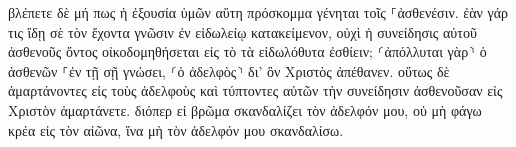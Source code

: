 \documentclass{openreader}
\begin{document}
βλέπετε δὲ μή πως ἡ ἐξουσία ὑμῶν αὕτη πρόσκομμα γένηται τοῖς ⸀ἀσθενέσιν. 
ἐὰν γάρ τις ἴδῃ σὲ τὸν ἔχοντα γνῶσιν ἐν εἰδωλείῳ κατακείμενον, οὐχὶ ἡ συνείδησις αὐτοῦ ἀσθενοῦς ὄντος οἰκοδομηθήσεται εἰς τὸ τὰ εἰδωλόθυτα ἐσθίειν; 
⸂ἀπόλλυται γὰρ⸃ ὁ ἀσθενῶν ⸀ἐν τῇ σῇ γνώσει, ⸂ὁ ἀδελφὸς⸃ δι’ ὃν Χριστὸς ἀπέθανεν. 
οὕτως δὲ ἁμαρτάνοντες εἰς τοὺς ἀδελφοὺς καὶ τύπτοντες αὐτῶν τὴν συνείδησιν ἀσθενοῦσαν εἰς Χριστὸν ἁμαρτάνετε. 
διόπερ εἰ βρῶμα σκανδαλίζει τὸν ἀδελφόν μου, οὐ μὴ φάγω κρέα εἰς τὸν αἰῶνα, ἵνα μὴ τὸν ἀδελφόν μου σκανδαλίσω. 
\end{document}
